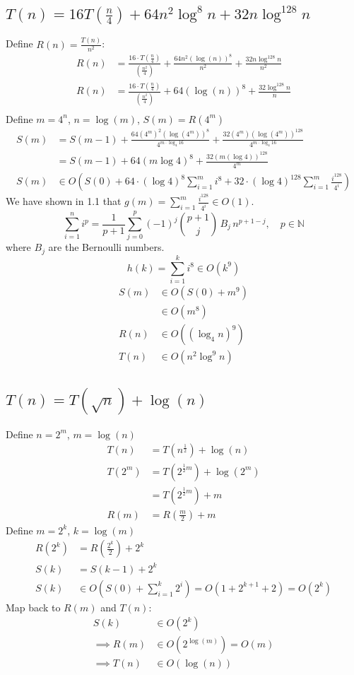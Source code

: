 \documentclass{article}
\begin{document}
\subsection{$T(n) = 16T(\frac{n}{4}) + 64n^2 \log^8 n + 32n \log^{128} n$}
Define $R(n) = \frac{T(n)}{n^2}$:
\begin{align*}
    R(n) &= \frac{16\cdot T(\frac{n}{4})}{(\frac{n^2}{4})} + \frac{64n^2(\log(n))^8}{n^2} + \frac{32n\log^{128}n}{n^2}\\
    R(n) &= \frac{16\cdot T(\frac{n}{4})}{(\frac{n^2}{4})} + 64(\log(n))^8 + \frac{32\log^{128}n}{n}\\
\end{align*}
Define $m = 4^n$, $n = \log(m)$, $S(m) = R(4^m)$
\begin{align*}
    S(m) &= S(m - 1) + \frac{64(4^m)^2(\log(4^m))^8}{4^{m\cdot \log_4 16}}+ \frac{32 (4^m) (\log(4^m))^{128}}{4^{m\cdot \log_4 16}}\\
    &= S(m - 1) + 64(m\log 4)^8 + \frac{32(m(\log 4))^{128}}{4^m}\\
    S(m) &\in O\left(S(0) + 64\cdot (\log 4)^8\sum_{i=1}^{m}i^8 + 32\cdot (\log 4)^{128}\sum_{i=1}^{m} \frac{i^{128}}{4^i}\right) 
\end{align*}
We have shown in 1.1 that $g(m) = \sum_{i=1}^{m} \frac{i^{128}}{4^i} \in O(1)$.\\
    \[\sum_{i=1}^{n} i^p = \frac{1}{p+1}\sum_{j=0}^{p} (-1)^j \binom{p+1}{j}\, B_j \, n^{p+1-j},
    \quad p\in\mathbb{N}\] 
    where \(B_j\) are the Bernoulli numbers.    
    \[h(k) = \sum_{i=1}^{k}i^8 \in O(k^9)\]
    \begin{align*}
        S(m) &\in O(S(0) + m^9)\\
        &\in O(m^8)\\
        R(n) &\in O((\log_4 n)^9)\\
        T(n) &\in O(n^2 \log^9n)
    \end{align*}


\subsection{$T(n) = T(\sqrt{n}) + \log(n)$}
Define $n = 2^m$, $m = \log(n)$ 
\begin{align*}
    T(n) &= T(n^{\frac{1}{2}}) + \log(n)\\
    T(2^m) &= T(2^{\frac{1}{2} m}) + \log(2^m)\\
    &= T(2^{\frac{1}{2} m}) + m\\
    R(m) &= R(\frac{m}{2}) + m
\end{align*}
Define $m = 2^k$, $k = \log(m)$
\begin{align*}
    R(2^k) &= R(\frac{2^k}{2}) + 2^k\\
    S(k) &= S(k-1) + 2^k\\
    S(k) &\in O(S(0) + \sum_{i=1}^{k} 2^i) = O(1 + 2^{k + 1} + 2) = O(2^k)
\end{align*}
Map back to $R(m)$ and $T(n)$:
\begin{align*}
    S(k) &\in O(2^k)\\
    \implies R(m) &\in O(2^{\log(m)}) = O(m)\\
    \implies T(n) &\in O(\log(n))
\end{align*}
\end{document}
